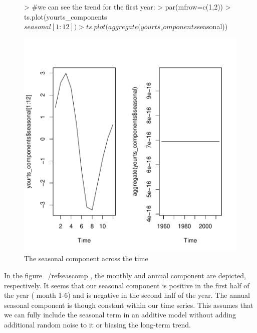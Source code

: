 \documentclass[11pt, a4paper]{article} %
\begin{document}
\begin{figure}[H]
\centering
\begin{Schunk}
\begin{Sinput}
> #we can see the trend for the first year:
> par(mfrow=c(1,2))
> ts.plot(yourts_components$seasonal[1:12])
> ts.plot(aggregate(yourts_components$seasonal))
\end{Sinput}
\end{Schunk}
\includegraphics{alleselena-seascomp}
\caption{The seasonal component across the time}
\label{seascomp}
\end{figure}

In the figure ~/ref{seascomp} , the monthly and annual component are depicted, respectively. It seems that our seasonal component is positive in the first half of the year ( month 1-6) and is negative in the second half of the year. The annual seasonal component is though constant within our time series. This assumes that we can fully include the seasonal term in an additive model without adding additional random noise to it or biasing the long-term trend. 
\end{document}

